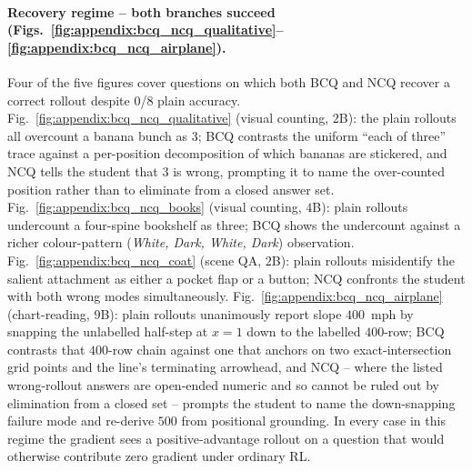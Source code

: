 \documentclass{llmxive}
\begin{document}
\paragraph{Recovery regime -- both branches succeed (Figs.~\ref{fig:appendix:bcq_ncq_qualitative}--\ref{fig:appendix:bcq_ncq_airplane}).}
Four of the five figures cover questions on which both BCQ and NCQ recover a correct rollout despite $0$/$8$ plain accuracy. Fig.~\ref{fig:appendix:bcq_ncq_qualitative} (visual counting, $2$B): the plain rollouts all overcount a banana bunch as $3$; BCQ contrasts the uniform ``each of three'' trace against a per-position decomposition of which bananas are stickered, and NCQ tells the student that $3$ is wrong, prompting it to name the over-counted position rather than to eliminate from a closed answer set. Fig.~\ref{fig:appendix:bcq_ncq_books} (visual counting, $4$B): plain rollouts undercount a four-spine bookshelf as three; BCQ shows the undercount against a richer colour-pattern (\emph{White, Dark, White, Dark}) observation. Fig.~\ref{fig:appendix:bcq_ncq_coat} (scene QA, $2$B): plain rollouts misidentify the salient attachment as either a pocket flap or a button; NCQ confronts the student with both wrong modes simultaneously. Fig.~\ref{fig:appendix:bcq_ncq_airplane} (chart-reading, $9$B): plain rollouts unanimously report slope $400$~mph by snapping the unlabelled half-step at $x\!=\!1$ down to the labelled $400$-row; BCQ contrasts that $400$-row chain against one that anchors on two exact-intersection grid points and the line's terminating arrowhead, and NCQ -- where the listed wrong-rollout answers are open-ended numeric and so cannot be ruled out by elimination from a closed set -- prompts the student to name the down-snapping failure mode and re-derive $500$ from positional grounding. In every case in this regime the gradient sees a positive-advantage rollout on a question that would otherwise contribute zero gradient under ordinary RL.
\end{document}
